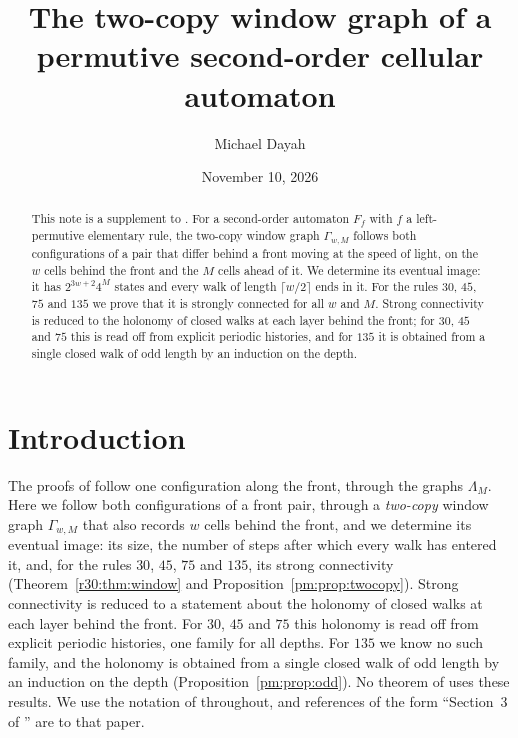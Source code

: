 \documentclass[11pt]{amsart}
\title[The two-copy window graph]{The two-copy window graph of a permutive second-order cellular automaton}
\author{Michael Dayah}
\date{November 10, 2026}
\theoremstyle{definition}
\theoremstyle{remark}
\begin{document}
\begin{abstract}
This note is a supplement to \cite{PaperB}. For a second-order automaton $F_f$ with $f$ a left-permutive elementary rule, the two-copy window graph $\Gamma_{w,M}$ follows both configurations of a pair that differ behind a front moving at the speed of light, on the $w$ cells behind the front and the $M$ cells ahead of it. We determine its eventual image: it has $2^{3w+2}4^M$ states and every walk of length $\lceil w/2\rceil$ ends in it. For the rules $30$, $45$, $75$ and $135$ we prove that it is strongly connected for all $w$ and $M$. Strong connectivity is reduced to the holonomy of closed walks at each layer behind the front; for $30$, $45$ and $75$ this is read off from explicit periodic histories, and for $135$ it is obtained from a single closed walk of odd length by an induction on the depth.
\end{abstract}

\maketitle

\section{Introduction}\label{tc:sec:intro}

The proofs of \cite{PaperB} follow one configuration along the front, through the graphs $\Lambda_M$. Here we follow both configurations of a front pair, through a \emph{two-copy} window graph $\Gamma_{w,M}$ that also records $w$ cells behind the front, and we determine its eventual image: its size, the number of steps after which every walk has entered it, and, for the rules $30$, $45$, $75$ and $135$, its strong connectivity (Theorem~\ref{r30:thm:window} and Proposition~\ref{pm:prop:twocopy}). Strong connectivity is reduced to a statement about the holonomy of closed walks at each layer behind the front. For $30$, $45$ and $75$ this holonomy is read off from explicit periodic histories, one family for all depths. For $135$ we know no such family, and the holonomy is obtained from a single closed walk of odd length by an induction on the depth (Proposition~\ref{pm:prop:odd}). No theorem of \cite{PaperB} uses these results. We use the notation of \cite{PaperB} throughout, and references of the form ``Section~3 of \cite{PaperB}'' are to that paper.




\end{document}
